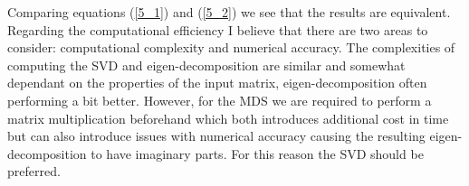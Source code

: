Comparing equations (\ref{5_1}) and (\ref{5_2}) we see that the results are equivalent. \\

Regarding the computational efficiency I believe that there are two areas to consider: computational complexity and numerical accuracy. The complexities of computing the SVD and eigen-decomposition are similar and somewhat dependant on the properties of the input matrix, eigen-decomposition often performing a bit better. However, for the MDS we are required to perform a matrix multiplication beforehand which both introduces additional cost in time but can also introduce issues with numerical accuracy causing the resulting eigen-decomposition to have imaginary parts. For this reason the SVD should be preferred. 
